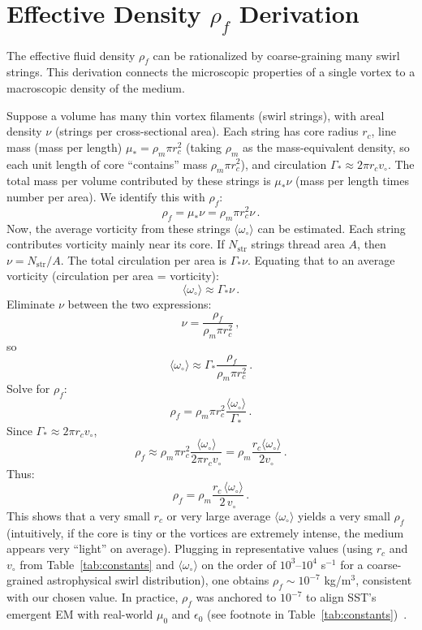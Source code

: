 \documentclass[aps,onecolumn,10pt,nofootinbib]{revtex4}
\begin{document}
	\section{Effective Density $\rho_f$ Derivation}
	The effective fluid density $\rho_f$ can be rationalized by coarse-graining many swirl strings. This derivation connects the microscopic properties of a single vortex to a macroscopic density of the medium.

	Suppose a volume has many thin vortex filaments (swirl strings), with areal density $\nu$ (strings per cross-sectional area). Each string has core radius $r_c$, line mass (mass per length) $\mu_* = \rho_m \pi r_c^2$ (taking $\rho_m$ as the mass-equivalent density, so each unit length of core “contains” mass $\rho_m \pi r_c^2$), and circulation $\Gamma_* \approx 2\pi r_c v_{\circ}$. The total mass per volume contributed by these strings is $\mu_*\nu$ (mass per length times number per area). We identify this with $\rho_f$:
	\[
		\rho_f = \mu_* \nu = \rho_m \pi r_c^2 \nu\,.
	\]
	Now, the average vorticity from these strings $\langle \omega_{\circ}\rangle$ can be estimated. Each string contributes vorticity mainly near its core. If $N_{\text{str}}$ strings thread area $A$, then $\nu = N_{\text{str}}/A$. The total circulation per area is $\Gamma_* \nu$. Equating that to an average vorticity (circulation per area = vorticity):
	\[
		\langle \omega_{\circ} \rangle \approx \Gamma_* \nu\,.
	\]
	Eliminate $\nu$ between the two expressions:
	\[
		\nu = \frac{\rho_f}{\rho_m \pi r_c^2}\,,
	\]
	so
	\[
		\langle \omega_{\circ} \rangle \approx \Gamma_* \frac{\rho_f}{\rho_m \pi r_c^2}\,.
	\]
	Solve for $\rho_f$:
	\[
		\rho_f = \rho_m \pi r_c^2 \frac{\langle \omega_{\circ}\rangle}{\Gamma_*}\,.
	\]
	Since $\Gamma_* \approx 2\pi r_c v_{\circ}$,
	\[
		\rho_f \approx \rho_m \pi r_c^2 \frac{\langle \omega_{\circ}\rangle}{2\pi r_c v_{\circ}} = \rho_m \frac{r_c \langle \omega_{\circ}\rangle}{2 v_{\circ}}\,.
	\]
	Thus:
	\[
		\rho_f = \rho_m \frac{r_c\,\langle \omega_{\circ}\rangle}{2\,v_{\circ}}\,.
	\]
	This shows that a very small $r_c$ or very large average $\langle \omega_{\circ}\rangle$ yields a very small $\rho_f$~\cite{index118} (intuitively, if the core is tiny or the vortices are extremely intense, the medium appears very “light” on average). Plugging in representative values (using $r_c$ and $v_{\circ}$ from Table~\ref{tab:constants} and $\langle \omega_{\circ}\rangle$ on the order of $10^3$–$10^4$ s$^{-1}$ for a coarse-grained astrophysical swirl distribution), one obtains $\rho_f \sim 10^{-7}$ kg/m$^3$, consistent with our chosen value. In practice, $\rho_f$ was anchored to $10^{-7}$ to align SST’s emergent EM with real-world $\mu_0$ and $\epsilon_0$ (see footnote in Table~\ref{tab:constants})~\cite{index119}.
\end{document}
